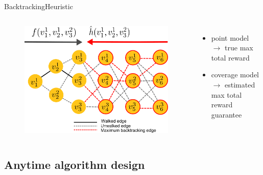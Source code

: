 \begin{frame}{Backtracking}{Heuristic}

\begin{columns}

\begin{minipage}{\textwidth}
\begin{figure}
\centering
\includegraphics[width = \textwidth]{./figure/backtracking}
\end{figure}
\end{minipage}

\begin{minipage}{\textwidth}
\begin{itemize}
\item point model $ \rightarrow $ true max total reward
\item coverage model $ \rightarrow $ estimated max total reward guarantee
\end{itemize}
\end{minipage}

\end{columns}

\end{frame}

\subsection{Anytime algorithm design}

